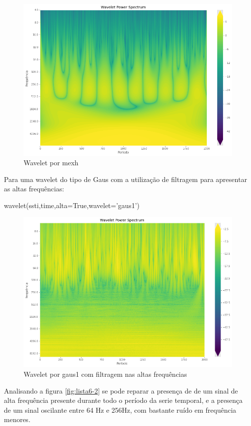 \documentclass[12pt,a4paper,portuguese]{article}
\begin{document}
\begin{figure}[H]
	\centering
	\includegraphics[width=1\linewidth]{lista6-3}
	\caption{Wavelet por mexh}
	\label{fig:lista6-3}
\end{figure}

Para uma wavelet do tipo de Gaus com a utilização de filtragem para apresentar as altas frequências:
\begin{python}
wavelet(ssti,time,alta=True,wavelet='gaus1')
\end{python}
\begin{figure}[H]
	\centering
	\includegraphics[width=1\linewidth]{lista6-4}
	\caption{Wavelet por gaus1 com filtragem nas altas frequências}
	\label{fig:lista6-4}
\end{figure}
Analisando a figura \ref{fig:lista6-2} se pode reparar a presença de de um sinal de alta frequência presente durante todo o período da serie temporal, e a presença de um sinal oscilante entre 64 Hz e 256Hz, com bastante ruído em frequência menores. \\
\end{document}
